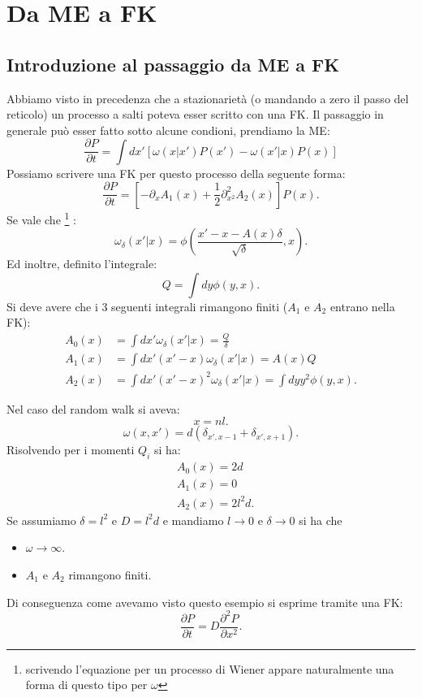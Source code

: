 \section{Da ME a FK}%
\label{sub:Lezione 14}
\mylocaltoc
\subsection{Introduzione al passaggio da ME a FK}%
\label{sub:Da Master Equation a Fokker Plank}
Abbiamo visto in precedenza che a stazionarietà (o mandando a zero il passo del reticolo) un processo a salti poteva esser scritto con una FK. Il passaggio in generale può esser fatto sotto alcune condioni, prendiamo la ME:
\begin{equation}
    \frac{\partial P}{\partial t} = \int dx' \left[\omega (x|x') P(x') - \omega (x'|x) P(x) \right]
    \label{eq:13-ME_gen}
\end{equation}
Possiamo scrivere una FK per questo processo della seguente forma:
\[
    \frac{\partial P}{\partial t} = \left[-\partial_{x}A_1(x) + \frac{1}{2}\partial^2_{x^2} A_2(x) \right]P(x) 
.\] 
Se vale che
\footnote{scrivendo l'equazione per un processo di Wiener appare naturalmente una forma di questo tipo per $\omega$}
:
\[
    \omega_\delta (x'|x) = \phi	\left( \frac{x'-x - A(x)\delta}{\sqrt{\delta}}, x\right)
.\] 
Ed inoltre, definito l'integrale:
\[
    Q = \int dy \phi (y, x) 
.\] 
Si deve avere che i 3 seguenti integrali rimangono finiti ($A_1$ e $A_2$ entrano nella FK):
\[\begin{aligned}
    A_0(x)  &= \int dx'\omega_\delta (x'|x) = \frac{Q}{\delta}\\
    A_1(x) &= \int dx' (x'-x) \omega_\delta\left(x'|x\right) = A(x) Q\\
    A_2(x) &= \int dx'(x'-x)^2 \omega_\delta\left(x'|x\right) = \int dy y^2\phi (y,x) 
.\end{aligned}\]
\begin{exmp}
    Nel caso del random walk si aveva:
    \[
        x = nl
    .\]
    \[
	\omega (x,x') = d(\delta_{x',x-1} + \delta_{x',x+1}) 
    .\] 
    Risolvendo per i momenti $Q_i$ si ha:
    \[\begin{aligned}
	&A_0(x) = 2d\\
	&A_1(x) = 0\\
	&A_2(x) = 2l^2d
    .\end{aligned}\]
    Se assumiamo $\delta =l^2$ e $D = l^2d$ e mandiamo $l\to 0$ e $\delta\to 0$ si ha che
    \begin{itemize}
        \item $\omega\to \infty$.
	\item $A_1$ e $A_2$ rimangono finiti.
    \end{itemize}
    Di conseguenza come avevamo visto questo esempio si esprime tramite una FK:
    \[
        \frac{\partial P}{\partial t} = D\frac{\partial ^2P}{\partial x^2} 
    .\] 
\end{exmp}
